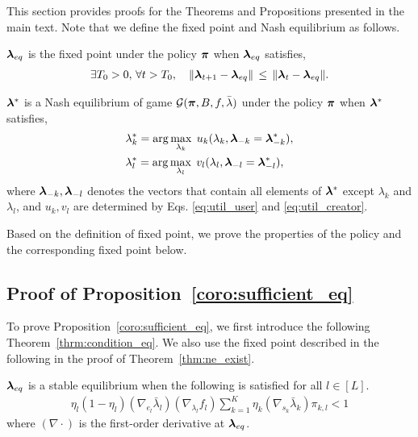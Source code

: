 This section provides proofs for the Theorems and Propositions presented in the main text. Note that we define the fixed point and Nash equilibrium as follows.

\begin{definition} \label{def:fixed_point} $\bm{\lambda}_{eq}$ is the fixed point under the policy $\bm{\pi}$ when $\bm{\lambda}_{eq}$ satisfies,
\begin{align*}
    \exists T_0 > 0, \, \forall t > T_{0}, \quad \lVert \bm{\lambda}_{t+1} - \bm{\lambda}_{eq} \rVert \, \leq \, \lVert \bm{\lambda}_{t} - \bm{\lambda}_{eq} \rVert.
\end{align*}
\end{definition}

\begin{definition} \label{def:nash_eq} $\bm{\lambda}^*$ is a Nash equilibrium of game $\mathcal{G}(\bm{\pi},B,f,\bar{\lambda})$ under the policy $\bm{\pi}$ when $\bm{\lambda}^*$ satisfies,
\begin{align*}
    & \lambda_k^* = \arg\max_{\lambda_k} \; u_k(\lambda_k,\bm{\lambda}_{-k}=\bm{\lambda}_{-k}^*), \\
    & \lambda_l^* = \arg\max_{\lambda_l} \; v_l(\lambda_l, \bm{\lambda}_{-l}=\bm{\lambda}_{-l}^*),
\end{align*}
where $\bm{\lambda}_{-k},\bm{\lambda}_{-l}$ denotes the vectors that contain all elements of $\bm{\lambda}^*$ except $\lambda_k$ and $\lambda_l$, and $u_k,v_l$ are determined by Eqs. \eqref{eq:util_user} and \eqref{eq:util_creator}.
\end{definition}

Based on the definition of fixed point, we prove the properties of the policy and the corresponding fixed point below.

\subsection{Proof of Proposition~\ref{coro:sufficient_eq}} \label{proof:condition_eq}
To prove Proposition~\ref{coro:sufficient_eq}, we first introduce the following Theorem~\ref{thrm:condition_eq}. We also use the fixed point described in the following in the proof of Theorem~\ref{thm:ne_exist}.

\begin{theorem} \label{thrm:condition_eq}
    $\bm{\lambda}_{eq}$ is a stable equilibrium when the following is satisfied for all $l \in [L]$. 
    \begin{align*}
        \eta_l (1 - \eta_l) (\nabla_{e_l} \bar{\lambda}_l) (\nabla_{\lambda_l} f_l) \sum_{k=1}^{K} \eta_{k} (\nabla_{s_k} \bar{\lambda}_k) \pi_{k,l} < 1
    \end{align*}
    where $(\nabla \cdot)$ is the first-order derivative at $\bm{\lambda}_{eq}$.
\end{theorem}

